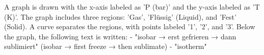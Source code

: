 A graph is drawn with the x-axis labeled as 'P (bar)' and the y-axis labeled as 'T (K)'. The graph includes three regions: 'Gas', 'Flüssig' (Liquid), and 'Fest' (Solid). A curve separates the regions, with points labeled '1', '2', and '3'. Below the graph, the following text is written:  
- "isobar → erst gefrieren → dann sublimiert" (isobar → first freeze → then sublimate)  
- "isotherm"